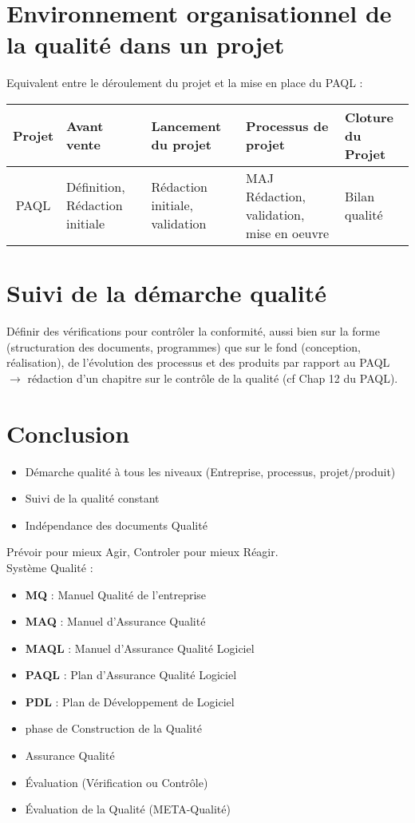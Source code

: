 \section{Environnement organisationnel de la qualité dans un projet}


Equivalent entre le déroulement du projet et la mise en place du PAQL :\\

\begin{tabular}{|c|p{3cm}|p{3cm}|p{3cm}|p{3cm}|}
\hline
Projet & Avant vente & Lancement du projet & Processus de projet & Cloture du Projet\\
\hline
PAQL & Définition, Rédaction initiale & Rédaction initiale, validation & MAJ Rédaction, validation, mise en oeuvre & Bilan qualité\\
\hline
\end{tabular}

\section{Suivi de la démarche qualité}

Définir des vérifications pour contrôler la conformité, aussi bien sur la forme (structuration des documents, programmes) que sur le fond (conception, réalisation), de l’évolution des processus et des produits par rapport au PAQL $\rightarrow$ rédaction d’un chapitre sur le contrôle de la qualité (cf Chap 12 du PAQL).

\section{Conclusion}

\begin{itemize}
\item Démarche qualité à tous les niveaux (Entreprise, processus, projet/produit)
\item Suivi de la qualité constant
\item Indépendance des documents Qualité
\end{itemize}

Prévoir pour mieux Agir, Controler pour mieux Réagir.\\

Système Qualité :
\begin{itemize}
\item \textbf{MQ} : Manuel Qualité de l’entreprise
\item \textbf{MAQ} : Manuel d’Assurance Qualité  
\item \textbf{MAQL} : Manuel d'Assurance Qualité Logiciel
\item \textbf{PAQL} : Plan d’Assurance Qualité Logiciel
\item \textbf{PDL} : Plan de Développement de Logiciel 
\item phase de Construction de la Qualité
\item Assurance Qualité
\item Évaluation (Vérification ou Contrôle)
\item Évaluation de la Qualité (META-Qualité)
\end{itemize}

